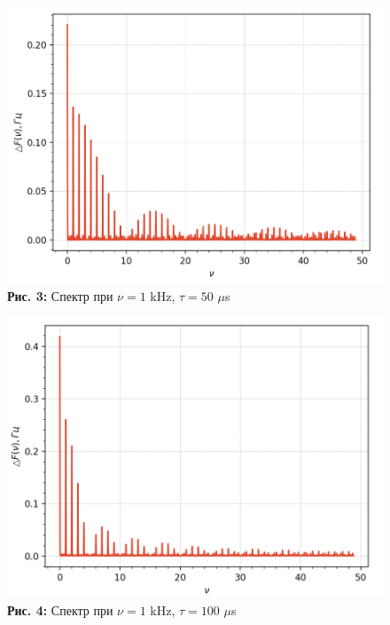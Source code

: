 \documentclass[12pt,a4paper]{scrartcl}
\begin{document}
	\begin{figure}[h]
		\begin{minipage}{0.5\linewidth}
			\begin{center}
				\includegraphics[scale=0.247]{PIC_3.png}
				\\\textbf{Рис. 3:} Спектр при $\nu = 1$ kHz, $\tau = 50$ $\mu$s
			\end{center}
		\end{minipage}
		\begin{minipage}{0.5\linewidth}
			\begin{center}
				\includegraphics[scale=0.25]{PIC_4.png}
				\\\textbf{Рис. 4:} Спектр при $\nu = 1$ kHz, $\tau = 100$ $\mu$s
			\end{center}
		\end{minipage}
	\end{figure}
\end{document}
